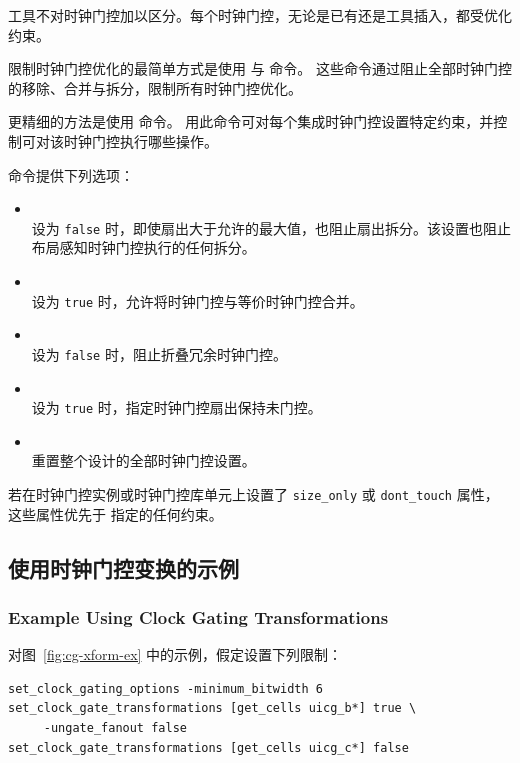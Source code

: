 工具不对时钟门控加以区分。每个时钟门控，无论是已有还是工具插入，都受优化约束。

限制时钟门控优化的最简单方式是使用  与  命令。
这些命令通过阻止全部时钟门控的移除、合并与拆分，限制所有时钟门控优化。

更精细的方法是使用  命令。
用此命令可对每个集成时钟门控设置特定约束，并控制可对该时钟门控执行哪些操作。

 命令提供下列选项：
\begin{itemize}
  \item {}\\
    设为 \texttt{false} 时，即使扇出大于允许的最大值，也阻止扇出拆分。该设置也阻止布局感知时钟门控执行的任何拆分。
  \item {}\\
    设为 \texttt{true} 时，允许将时钟门控与等价时钟门控合并。
  \item {}\\
    设为 \texttt{false} 时，阻止折叠冗余时钟门控。
  \item {}\\
    设为 \texttt{true} 时，指定时钟门控扇出保持未门控。
  \item {}\\
    重置整个设计的全部时钟门控设置。
\end{itemize}

若在时钟门控实例或时钟门控库单元上设置了 \texttt{size\_only} 或 \texttt{dont\_touch} 属性，这些属性优先于  指定的任何约束。

\subsection{使用时钟门控变换的示例}
\subsubsection*{Example Using Clock Gating Transformations}

对图~\ref{fig:cg-xform-ex} 中的示例，假定设置下列限制：
\begin{lstlisting}
set_clock_gating_options -minimum_bitwidth 6
set_clock_gate_transformations [get_cells uicg_b*] true \
     -ungate_fanout false
set_clock_gate_transformations [get_cells uicg_c*] false
\end{lstlisting}

